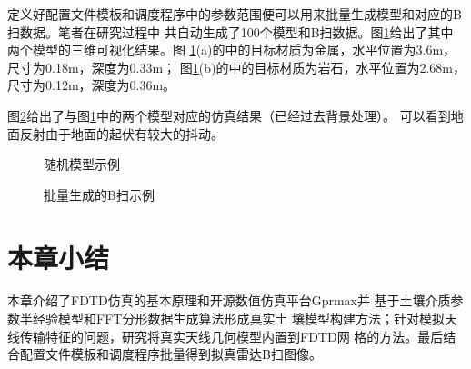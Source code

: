 定义好配置文件模板和调度程序中的参数范围便可以用来批量生成模型和对应的B扫数据。笔者在研究过程中
共自动生成了100个模型和B扫数据。图\ref{model_example}给出了其中两个模型的三维可视化结果。图
\ref{model_example}(a)的中的目标材质为金属，水平位置为3.6m，尺寸为0.18m，深度为0.33m；
图\ref{model_example}(b)的中的目标材质为岩石，水平位置为2.68m，尺寸为0.12m，深度为0.36m。

图\ref{bscan_example}给出了与图\ref{model_example}中的两个模型对应的仿真结果（已经过去背景处理）。
可以看到地面反射由于地面的起伏有较大的抖动。
\begin{figure}[htbp]
	\caption{随机模型示例}
	\label{model_example}
\end{figure}

\begin{figure}[htbp]
	\caption{批量生成的B扫示例}
	\label{bscan_example}
\end{figure}
\section{本章小结}
本章介绍了FDTD仿真的基本原理和开源数值仿真平台Gprmax并
基于土壤介质参数半经验模型和FFT分形数据生成算法形成真实土
壤模型构建方法；针对模拟天线传输特征的问题，研究将真实天线几何模型内置到FDTD网
格的方法。最后结合配置文件模板和调度程序批量得到拟真雷达B扫图像。